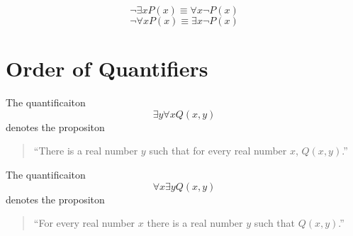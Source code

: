 \begin{equation}
  \neg \exists x P(x) \equiv \forall x \neg P(x)
\end{equation}
\begin{equation}
  \neg \forall x P(x) \equiv \exists x \neg P(x)
\end{equation}

\section{Order of Quantifiers}

The quantificaiton
\begin{equation}
  \exists y \forall x Q(x, y)
\end{equation}
denotes the propositon
\begin{quote}
  ``There is a real number $y$ such that for every real number $x$, $Q(x, y)$.''
\end{quote}

The quantificaiton
\begin{equation}
  \forall x \exists y Q(x, y)
\end{equation}
denotes the propositon
\begin{quote}
  ``For every real number $x$ there is a real number $y$ such that $Q(x, y)$.''
\end{quote}

